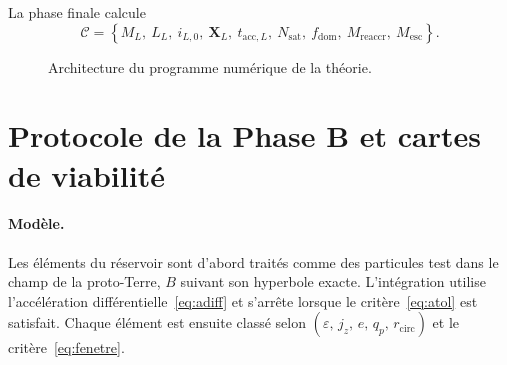 \documentclass[11pt,a4paper,openany]{report}
\begin{document}
La phase finale calcule
\begin{equation}
\mathcal{C}=\left\{M_L,\ L_L,\ i_{L,0},\ \mathbf{X}_L,\ t_{\mathrm{acc},L},\ N_{\mathrm{sat}},\
f_{\mathrm{dom}},\ M_{\mathrm{reaccr}},\ M_{\mathrm{esc}}\right\}.
\label{eq:phaseC}
\end{equation}

\begin{figure}[htbp]
\centering
{}
\caption{Architecture du programme numérique de la théorie.}
\label{fig:programme}
\end{figure}


\section{Protocole de la Phase B et cartes de viabilité}

\paragraph{Modèle.}
Les éléments du réservoir sont d'abord traités comme des particules test dans le champ de la
proto-Terre, $B$ suivant son hyperbole exacte. L'intégration utilise l'accélération
différentielle~\eqref{eq:adiff} et s'arrête lorsque le critère~\eqref{eq:atol} est satisfait. Chaque
élément est ensuite classé selon $(\varepsilon,\,j_z,\,e,\,q_p,\,r_{\mathrm{circ}})$ et le
critère~\eqref{eq:fenetre}.
\end{document}
